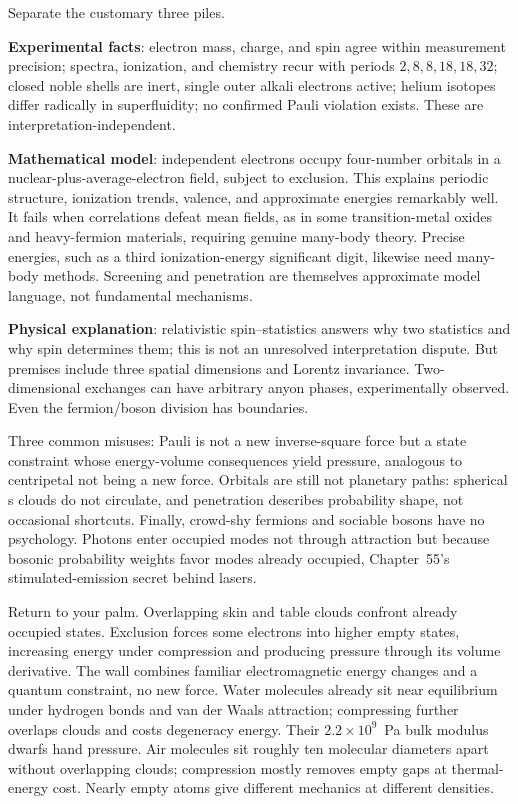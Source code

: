 
Separate the customary three piles.

\textbf{Experimental facts}: electron mass, charge, and spin agree within measurement precision; spectra, ionization, and chemistry recur with periods \(2,8,8,18,18,32\); closed noble shells are inert, single outer alkali electrons active; helium isotopes differ radically in superfluidity; no confirmed Pauli violation exists. These are interpretation-independent.

\textbf{Mathematical model}: independent electrons occupy four-number orbitals in a nuclear-plus-average-electron field, subject to exclusion. This explains periodic structure, ionization trends, valence, and approximate energies remarkably well. It fails when correlations defeat mean fields, as in some transition-metal oxides and heavy-fermion materials, requiring genuine many-body theory. Precise energies, such as a third ionization-energy significant digit, likewise need many-body methods. Screening and penetration are themselves approximate model language, not fundamental mechanisms.

\textbf{Physical explanation}: relativistic spin--statistics answers why two statistics and why spin determines them; this is not an unresolved interpretation dispute. But premises include three spatial dimensions and Lorentz invariance. Two-dimensional exchanges can have arbitrary anyon phases, experimentally observed. Even the fermion/boson division has boundaries.

Three common misuses: Pauli is not a new inverse-square force but a state constraint whose energy-volume consequences yield pressure, analogous to centripetal not being a new force. Orbitals are still not planetary paths: spherical s clouds do not circulate, and penetration describes probability shape, not occasional shortcuts. Finally, crowd-shy fermions and sociable bosons have no psychology. Photons enter occupied modes not through attraction but because bosonic probability weights favor modes already occupied, Chapter~55's stimulated-emission secret behind lasers.


Return to your palm. Overlapping skin and table clouds confront already occupied states. Exclusion forces some electrons into higher empty states, increasing energy under compression and producing pressure through its volume derivative. The wall combines familiar electromagnetic energy changes and a quantum constraint, no new force. Water molecules already sit near equilibrium under hydrogen bonds and van der Waals attraction; compressing further overlaps clouds and costs degeneracy energy. Their \(2.2\times10^{9}\)~Pa bulk modulus dwarfs hand pressure. Air molecules sit roughly ten molecular diameters apart without overlapping clouds; compression mostly removes empty gaps at thermal-energy cost. Nearly empty atoms give different mechanics at different densities.

